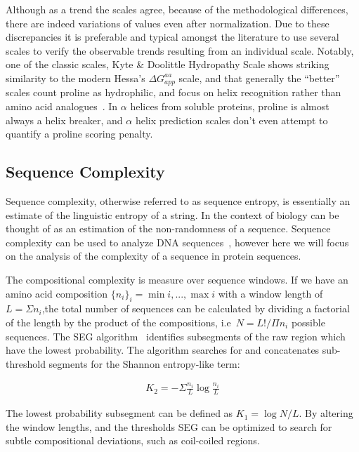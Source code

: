 Although as a trend the scales agree, because of the methodological differences, there are indeed variations of values even after normalization. Due to these discrepancies it is preferable and typical amongst the literature to use several scales to verify the observable trends resulting from an individual scale. Notably, one of the classic scales, Kyte \& Doolittle Hydropathy Scale shows striking similarity to the modern Hessa's ${\Delta G}_{app}^{aa}$ scale, and that generally the ``better'' scales count proline as hydrophilic, and focus on helix recognition rather than amino acid analogues~\cite{Peters2014}. In $\alpha$ helices from soluble proteins, proline is almost always a helix breaker, and $\alpha$ helix prediction scales don't even attempt to quantify a proline scoring penalty.

\subsection{Sequence Complexity}

Sequence complexity, otherwise referred to as sequence entropy, is essentially an estimate of the linguistic entropy of a string. In the context of biology can be thought of as an estimation of the non-randomness of a sequence. Sequence complexity can be used to analyze DNA sequences~\cite{Pinho2013, Oliver1993, Troyanskaya2002}, however here we will focus on the analysis of the complexity of a sequence in protein sequences.

The compositional complexity is measure over sequence windows. If we have an amino acid composition $\{{n}_i\}_i=\min{i},...,\max{i} $ with a window length of $L=\Sigma {n}_i $,the total number of sequences can be calculated by dividing a factorial of the length by the product of the compositions, i.e\  $ N = L!/\Pi{n}_i $ possible sequences. The SEG algorithm~\cite{WOOTTON1994269, Wootton1996} identifies subsegments of the raw region which have the lowest probability. The algorithm searches for and concatenates sub-threshold segments for the Shannon entropy-like term:

\begin{align*}
{K}_{2}=-\Sigma\frac{n_i}{L}\log\frac{n_i}{L}
\end{align*}

The lowest probability subsegment can be defined as $ K_1=\log N/L $. By altering the window lengths, and the thresholds SEG can be optimized to search for subtle compositional deviations, such as coil-coiled regions.


